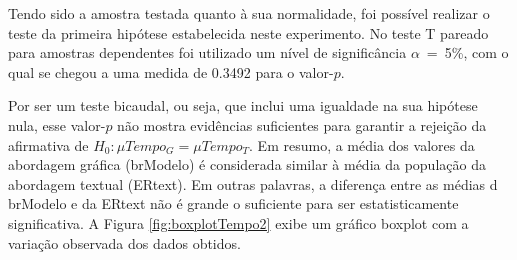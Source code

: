 Tendo sido a amostra testada quanto à sua normalidade, foi possível realizar o teste da primeira hipótese estabelecida neste experimento. 
No teste T pareado para amostras dependentes foi utilizado um nível de significância $\alpha$~=~5\%, com o qual se chegou a uma medida de 0.3492 para o valor-$p$. 

Por ser um teste bicaudal, ou seja, que inclui uma igualdade na sua hipótese nula, esse valor-$p$ não mostra evidências suficientes para garantir a rejeição da afirmativa de $H_0 : \mu Tempo_G = \mu Tempo_T$.
Em resumo, a média dos valores da abordagem gráfica (brModelo) é considerada similar à média da população da abordagem textual (ERtext).
Em outras palavras, a diferença entre as médias d brModelo e da ERtext não é grande o suficiente para ser estatisticamente significativa.
A Figura \ref{fig:boxplotTempo2} exibe um gráfico boxplot com a variação observada dos dados obtidos. 






